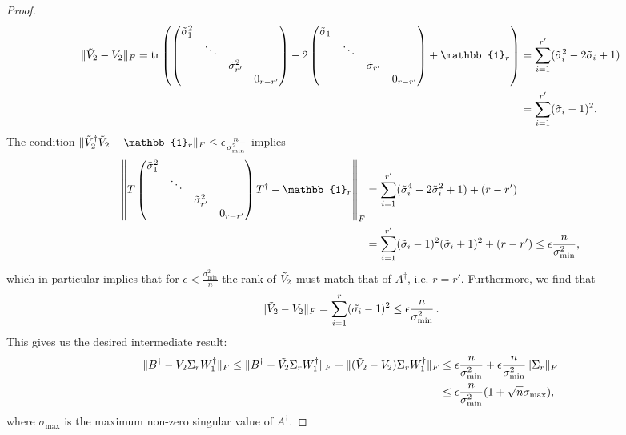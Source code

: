 \begin{proof}
\begin{align*}
\|\Tilde{V}_2-V_2\|_F=\operatorname{tr}\left(
\begin{pmatrix}
\Tilde{\sigma}_1^2&&&\\
&\ddots&&\\
&&\Tilde{\sigma}_{r'}^2&\\
&&& 0_{r-r'}
\end{pmatrix} -2
\begin{pmatrix}
\Tilde{\sigma}_1&&&\\
&\ddots&&\\
&&\Tilde{\sigma}_{r'}&\\
&&& 0_{r-r'}
\end{pmatrix}+\mathbb{1}_r\right) & =\sum_{i=1}^{r'}(\Tilde{\sigma}_i^2-2\Tilde{\sigma}_i+1)\\ & =\sum_{i=1}^{r'}(\Tilde{\sigma}_i-1)^2.
\end{align*}
The condition $\|\Tilde{V}_2^{\dag}\Tilde{V}_2 -\mathbb{1}_r\|_F\leq\epsilon\frac{n}{\sigma_{\text{min}}^2}$ implies
\begin{align*}
\left\|T
\begin{pmatrix}
\Tilde{\sigma}_1^2&&& \\
&\ddots&& \\
&&\Tilde{\sigma}_{r'}^2& \\
&&&0_{r-r'}
\end{pmatrix}T^{\dag}-\mathbb{1}_r\right\|_F & =\sum_{i=1}^{r'}(\Tilde{\sigma}_i^4-2\Tilde{\sigma}_i^2+1) + (r-r') \\
& = \sum_{i=1}^{r'}(\Tilde{\sigma}_i-1)^2(\Tilde{\sigma}_i+1)^2 + (r-r')\leq \epsilon\frac{n}{\sigma_{\text{min}}^2},
\end{align*}
which in particular implies that for $\epsilon<\frac{\sigma_{\text{min}}^2}{n}$ the rank of $\Tilde{V}_2$ must match that of $A^{\dag}$, i.e. $r=r'$. Furthermore, we find that
\begin{equation*}
\|\Tilde{V}_2-V_2\|_F = \sum_{i=1}^r(\Tilde{\sigma_i}-1)^2\leq\epsilon\frac{n}{\sigma_{\text{min}}^2}\thinspace.
\end{equation*}
This gives us the desired intermediate result:
\begin{align*}
\|B^{\dag}-V_2\Sigma_r W_1^{\dag}\|_F\leq \|B^{\dag}-\Tilde{V_2}\Sigma_r W_1^{\dag}\|_F + \|(\Tilde{V}_2-V_2)\Sigma_r W_1^{\dag}\|_F & \leq \epsilon\frac{n}{\sigma_{\text{min}}^2}+\epsilon\frac{n}{\sigma_{\text{min}}^2}\|\Sigma_r\|_F\\
& \leq \epsilon\frac{n}{\sigma_{\text{min}}^2}(1+\sqrt{n}\sigma_{\text{max}}),
\end{align*}
where $\sigma_{\text{max}}$ is the maximum non-zero singular value of $A^{\dag}$.
\end{proof}


